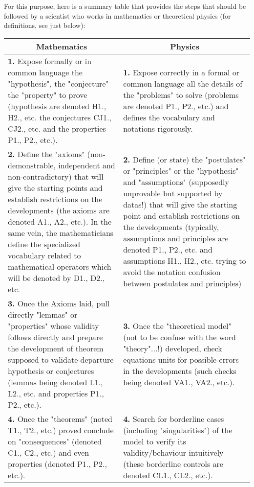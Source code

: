 	For this purpose, here is a summary table that provides the steps that should be followed by a scientist who works in mathematics or theoretical physics (for definitions, see just below)\label{methodology table}:
	\begin{table}[H]
		\centering
		\small
		\begin{tabular}{|p{7.5cm}|p{7.5cm}|}
			\hline
			\multicolumn{1}{c}{\cellcolor[gray]{0.75}\textbf{Mathematics}} & 
  \multicolumn{1}{c}{\cellcolor[gray]{0.75}\textbf{Physics}} \\ \hline
			\textbf{1.} Expose formally or in common language the "hypothesis", the "conjecture" the "property" to prove (hypothesis are denoted H1., H2., etc. the conjectures CJ1., CJ2., etc. and the properties P1., P2., etc.). & \textbf{1.} Expose correctly in a formal or common language all the details of the "problems" to solve (problems are denoted P1., P2., etc.) and defines the vocabulary and notations rigorously. \\ \hline
			\textbf{2.} Define the "axioms" (non-demonstrable, independent and non-contradictory) that will give the starting points and establish restrictions on the developments (the axioms are denoted A1., A2., etc.)\footnotemark. \newline\newline
			In the same vein, the mathematicians define the specialized vocabulary related to mathematical operators which will be denoted by D1., D2., etc. & 					\textbf{2.} Define (or state) the "postulates" or "principles" or the "hypothesis" and "assumptions" (supposedly unprovable but supported by datas!) that will give the starting point and establish restrictions on the developments (typically, assumptions and principles are denoted P1., P2., etc. and assumptions H1., H2., etc. trying to avoid the notation confusion between postulates and principles)\footnotemark \\ \hline
			\textbf{3.} Once the Axioms laid, pull directly "lemmas" or "properties" whose validity follows directly and prepare the development of theorem supposed to validate departure hypothesis or conjectures (lemmas being denoted L1., L2., etc. and properties P1., P2., etc.). & \textbf{3.} Once the "theoretical model" (not to be confuse with the word "theory"...!) developed, check equations units for possible errors in the developments (such checks being denoted VA1., VA2., etc.).\\ \hline
			\textbf{4.} Once the "theorems" (noted T1., T2., etc.) proved conclude on "consequences" (denoted C1., C2., etc.) and even properties (denoted P1., P2., etc.). & \textbf{4.} Search for borderline cases (including "singularities") of the model to verify its validity/behaviour intuitively (these borderline controls are denoted CL1., CL2., etc.).\\ \hline

\end{tabular}
\end{table}
